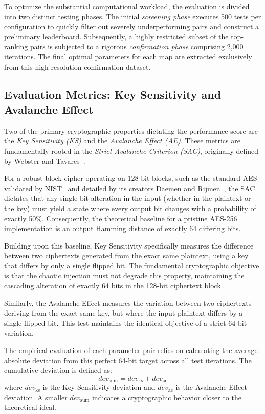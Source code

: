 \documentclass[11pt,a4paper]{report}
\begin{document}
To optimize the substantial computational workload, the evaluation is divided into two distinct testing phases. 
The initial \textit{screening phase} executes 500 tests per configuration to quickly filter out severely underperforming pairs and construct a preliminary leaderboard. 
Subsequently, a highly restricted subset of the top-ranking pairs is subjected to a rigorous \textit{confirmation phase} comprising 2,000 iterations. 
The final optimal parameters for each map are extracted exclusively from this high-resolution confirmation dataset.

\subsection{Evaluation Metrics: Key Sensitivity and Avalanche Effect}
Two of the primary cryptographic properties dictating the performance score are the \textit{Key Sensitivity (KS)} and the \textit{Avalanche Effect (AE)}. 
These metrics are fundamentally rooted in the \textit{Strict Avalanche Criterion (SAC)}, originally defined by Webster and Tavares~\cite{SAC}. 

For a robust block cipher operating on 128-bit blocks, such as the standard AES validated by NIST~\cite{AES} and detailed by its creators Daemen and Rijmen~\cite{OriginalAesPaper}, the SAC dictates that any single-bit alteration in the input (whether in the plaintext or the key) must yield a state where every output bit changes with a probability of exactly 50\%. 
Consequently, the theoretical baseline for a pristine AES-256 implementation is an output Hamming distance of exactly 64 differing bits.

Building upon this baseline, Key Sensitivity specifically measures the difference between two ciphertexts generated from the exact same plaintext, using a key that differs by only a single flipped bit. 
The fundamental cryptographic objective is that the chaotic injection must not degrade this property, maintaining the cascading alteration of exactly 64 bits in the 128-bit ciphertext block.

Similarly, the Avalanche Effect measures the variation between two ciphertexts deriving from the exact same key, but where the input plaintext differs by a single flipped bit. 
This test maintains the identical objective of a strict 64-bit variation.

The empirical evaluation of each parameter pair relies on calculating the average absolute deviation from this perfect 64-bit target across all test iterations. 
The cumulative deviation is defined as:
\begin{equation}
    dev_{\text{sum}} = dev_{\text{ks}} + dev_{\text{ae}}
\end{equation}
where $dev_{\text{ks}}$ is the Key Sensitivity deviation and $dev_{\text{ae}}$ is the Avalanche Effect deviation. 
A smaller $dev_{\text{sum}}$ indicates a cryptographic behavior closer to the theoretical ideal.
\end{document}
